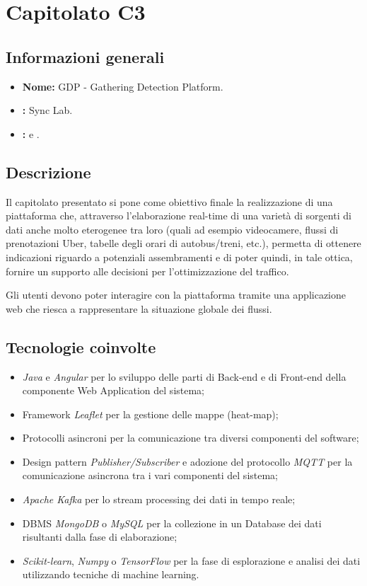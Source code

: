 \section{Capitolato C3}

\subsection{Informazioni generali}{
\begin{itemize}
\item \textbf{Nome:} GDP - Gathering Detection Platform.
\item \textbf{\commitProg:} Sync Lab.
\item \textbf{\proponProg:} \VT{} e \CR.
\end{itemize}
}

\subsection{Descrizione}{
Il capitolato presentato si pone come obiettivo finale la realizzazione di una piattaforma che, attraverso l'elaborazione real-time di una varietà di sorgenti di dati anche molto eterogenee tra loro (quali ad esempio videocamere, flussi di prenotazioni Uber, tabelle degli orari di autobus/treni, etc.), permetta di ottenere indicazioni riguardo a potenziali assembramenti e di poter quindi, in tale ottica, fornire un supporto alle decisioni per l'ottimizzazione del traffico.

Gli utenti devono poter interagire con la piattaforma tramite una applicazione web che riesca a rappresentare la situazione globale dei flussi.
}

\subsection{Tecnologie coinvolte}{
\begin{itemize}
\item \textit{Java} e \textit{Angular} per lo sviluppo delle parti di Back-end e di Front-end della componente Web Application del sistema; 
\item Framework \textit{Leaflet} per la gestione delle mappe (heat-map);
\item Protocolli asincroni per la comunicazione tra diversi componenti del software;
\item Design pattern \textit{Publisher/Subscriber} e adozione del protocollo \textit{MQTT} per la comunicazione asincrona tra i vari componenti del sistema;
\item \textit{Apache Kafka} per lo stream processing dei dati in tempo reale;
\item DBMS \textit{MongoDB} o \textit{MySQL}  per la collezione in un Database dei dati risultanti dalla fase di elaborazione;
\item \textit{Scikit-learn}, \textit{Numpy} o \textit{TensorFlow} per la fase di esplorazione e analisi dei dati utilizzando tecniche di machine learning.
\end{itemize}
}

